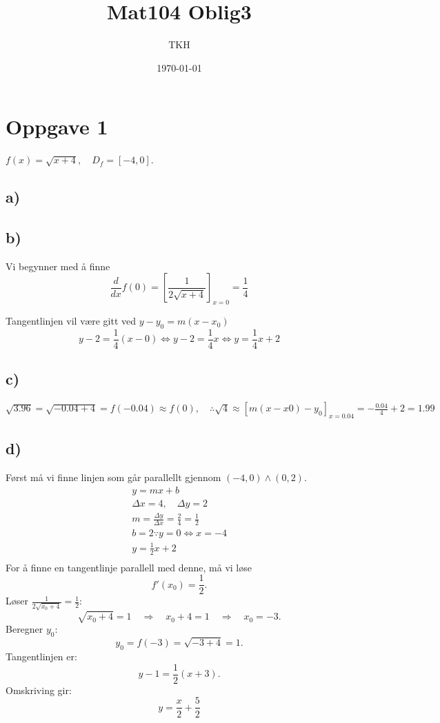 \documentclass[12pt]{article}
\title{Mat104 Oblig3}
\author{TKH}
\date{\today}
\begin{document}
\maketitle

\section*{Oppgave 1}
\(f(x) = \sqrt{x+4}, \quad D_f = [-4, 0] \).
\subsection*{a) }

\subsection*{b)}
Vi begynner med å finne
\[
\frac{d}{dx}f(0) = [\frac{1}{2\sqrt{x + 4}}]_{x=0}
= \frac{1}{4}
\]

\noindent
Tangentlinjen vil være gitt ved \(y-y_0 = m(x-x_0)\)
\[
  y-2 = \frac{1}{4}(x-0) \Leftrightarrow y-2 = \frac{1}{4}x 
  \Leftrightarrow \boxed{y=\frac{1}{4}x + 2}
\]

\subsection*{c)}
\(\sqrt{3.96} = \sqrt{-0.04 + 4} = f(-0.04) \approx f(0), 
\quad \therefore \sqrt{4} \approx [m(x-x0) - y_0]_{x = 0.04} 
= -\frac{0.04}{4} + 2 = \boxed{1.99}\)

\subsection*{d)}
Først må vi finne linjen som går parallellt gjennom \((-4, 0) \land (0, 2)\).
\begin{gather*}
  y = mx + b \\ 
  \Delta x = 4, \quad \Delta y = 2 \\ 
  m = \frac{\Delta y}{\Delta x} = \frac{2}{4} = \frac{1}{2} \\ 
  b = 2 \because y = 0 \Leftrightarrow x = -4 \\ 
  y = \frac{1}{2}x + 2 \\ 
\end{gather*}
For å finne en tangentlinje parallell med denne, må vi løse 
\[
f'(x_0) = \frac{1}{2}.
\]
Løser \( \frac{1}{2\sqrt{x_0+4}} = \frac{1}{2} \):
\[
\sqrt{x_0+4} = 1 \quad \Rightarrow \quad x_0 + 4 = 1 \quad \Rightarrow \quad x_0 = -3.
\]
Beregner \( y_0 \):
\[
y_0 = f(-3) = \sqrt{-3+4} = 1.
\]
Tangentlinjen er:
\[
y - 1 = \frac{1}{2}(x + 3).
\]
Omskriving gir:
\[
\boxed{y = \frac{x}{2} + \frac{5}{2}}
\]
\end{document}
